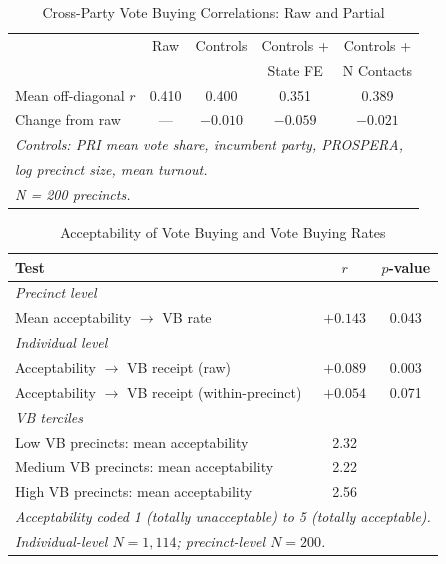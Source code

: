 \documentclass[12pt,letterpaper]{article}
\begin{document}

\begin{table}[H]
\centering
\caption{Cross-Party Vote Buying Correlations: Raw and Partial}
\label{tab:partial}
\small
\begin{tabular}{lcccc}
\toprule
& Raw & Controls & Controls + & Controls + \\
& & & State FE & N Contacts \\
\midrule
Mean off-diagonal $r$ & 0.410 & 0.400 & 0.351 & 0.389 \\
Change from raw & --- & $-0.010$ & $-0.059$ & $-0.021$ \\
\midrule
\multicolumn{5}{l}{\textit{Controls: PRI mean vote share, incumbent party, PROSPERA,}} \\
\multicolumn{5}{l}{\textit{log precinct size, mean turnout.}} \\
\multicolumn{5}{l}{\textit{N = 200 precincts.}} \\
\bottomrule
\end{tabular}
\end{table}

\begin{table}[H]
\centering
\caption{Acceptability of Vote Buying and Vote Buying Rates}
\label{tab:accept}
\small
\begin{tabular}{lcc}
\toprule
Test & $r$ & $p$-value \\
\midrule
\textit{Precinct level} & & \\
\quad Mean acceptability $\rightarrow$ VB rate & $+0.143$ & 0.043 \\
\midrule
\textit{Individual level} & & \\
\quad Acceptability $\rightarrow$ VB receipt (raw) & $+0.089$ & 0.003 \\
\quad Acceptability $\rightarrow$ VB receipt (within-precinct) & $+0.054$ & 0.071 \\
\midrule
\textit{VB terciles} & & \\
\quad Low VB precincts: mean acceptability & 2.32 & \\
\quad Medium VB precincts: mean acceptability & 2.22 & \\
\quad High VB precincts: mean acceptability & 2.56 & \\
\bottomrule
\multicolumn{3}{l}{\textit{Acceptability coded 1 (totally unacceptable) to 5 (totally acceptable).}} \\
\multicolumn{3}{l}{\textit{Individual-level $N = 1{,}114$; precinct-level $N = 200$.}} \\
\end{tabular}
\end{table}
\end{document}
